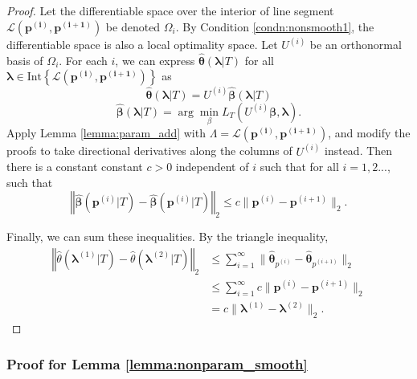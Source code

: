 \documentclass[10pt]{book}
\theoremstyle{definition}
\begin{document}
\begin{proof}
	Let the differentiable
	space over the interior of line segment $\mathcal{L}\left(\boldsymbol{p^{(i)},p^{(i+1)}}\right)$
	be denoted $\Omega_{i}$. 
	By Condition \ref{condn:nonsmooth1}, the differentiable space is also a local optimality
	space. Let $U^{(i)}$ be an orthonormal basis of $\Omega_{i}$. For
	each $i$, we can express $\hat{\boldsymbol{\theta}}(\boldsymbol{\lambda} | T)$ for
	all $\boldsymbol{\lambda}\in\mbox{Int}\left\{ \mathcal{L}\left(\boldsymbol{p^{(i)},p^{(i+1)}}\right)\right\} $
	as
	\[
	\hat{\boldsymbol{\theta}}(\boldsymbol{\lambda} | T)=U^{(i)}\hat{\boldsymbol{\beta}}(\boldsymbol{\lambda} | T)
	\]
	\[
	\hat{\boldsymbol{\beta}}(\boldsymbol{\lambda} | T)=\arg\min_{\beta}L_{T}(U^{(i)}\boldsymbol{\beta},\boldsymbol{\lambda}).
	\]
	Apply Lemma \ref{lemma:param_add} with $\Lambda= \mathcal{L}\left(\boldsymbol{p^{(i)},p^{(i+1)}}\right)$, and modify the proofs to take directional derivatives
	along the columns of $U^{(i)}$ instead. Then there is a constant
	constant $c>0$ independent of $i$ such that for all $i=1,2...$,
	such that
	\[
	\left\Vert 
	\boldsymbol{\hat{\beta}}(\boldsymbol{p}^{(i)} | T)
	-\boldsymbol{\hat{\beta}}(\boldsymbol{p}^{(i)} | T)
	\right\Vert _{2}
	\le 
	c\|\boldsymbol{p}^{(i)}-\boldsymbol{p}^{(i+1)}\|_{2}.
	\]
	
	
	Finally, we can sum these inequalities. By the triangle inequality,
	\begin{align*}
	\left\Vert 
	\hat{\theta}(\boldsymbol{\lambda}^{(1)} |T)
	- \hat{\theta}(\boldsymbol{\lambda}^{(2)} |T)
	\right\Vert _{2} 
	& \le \sum_{i=1}^{\infty}\|\boldsymbol{\hat{\theta}}_{p^{(i)}}-\boldsymbol{\hat{\theta}}_{p^{(i+1)}}\|_{2}\\
	& \le \sum_{i=1}^{\infty}
	c\|\boldsymbol{p}^{(i)}-\boldsymbol{p}^{(i+1)}\|_{2}\\
	& = c\|\boldsymbol{\lambda}^{(1)}-\boldsymbol{\lambda}^{(2)}\|_{2}.
	\end{align*}
\end{proof}

\subsubsection{Proof for Lemma \ref{lemma:nonparam_smooth}}
\end{document}
